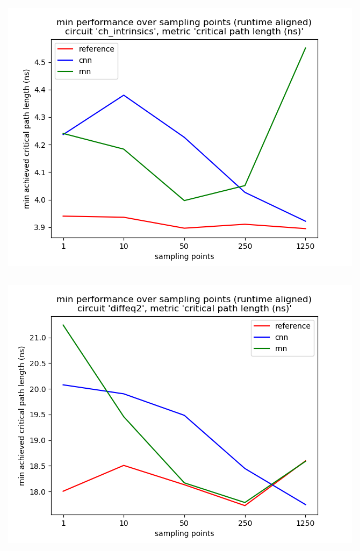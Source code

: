 \begin{figure}[H]
	\centering
	\begin{subfigure}[b]{0.49\linewidth}
		\includegraphics[width=\linewidth]{plots/eval-ch_intrinsics-critical-path-min-full.png}
	\end{subfigure}
	\begin{subfigure}[b]{0.49\linewidth}
		\includegraphics[width=\linewidth]{plots/eval-diffeq2-critical-path-min-full.png}
	\end{subfigure}
	\begin{subfigure}[b]{0.49\linewidth}

\end{subfigure}
\end{figure}
